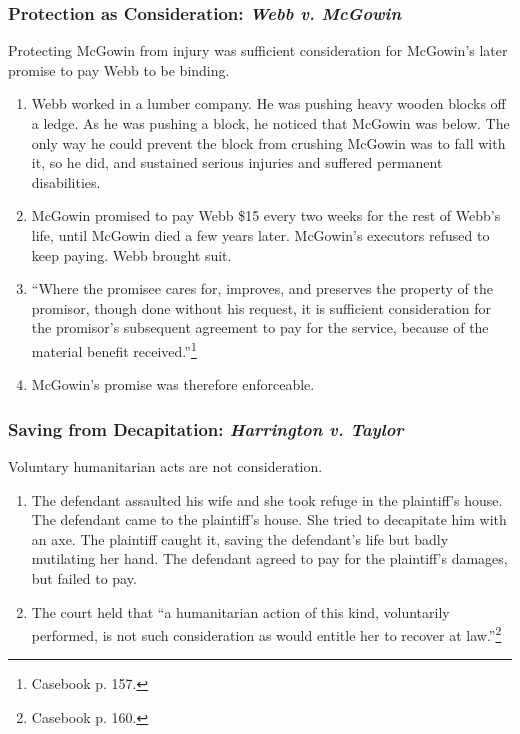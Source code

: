 \subsubsection{Protection as Consideration: \emph{Webb v. McGowin}}

Protecting McGowin from injury was sufficient consideration for McGowin's 
later promise to pay Webb to be binding.

\begin{enumerate}
    \item Webb worked in a lumber company. He was pushing heavy wooden blocks 
    off a ledge. As he was pushing a block, he noticed that McGowin was below. 
    The only way he could prevent the block from crushing McGowin was to fall 
    with it, so he did, and sustained serious injuries and suffered permanent 
    disabilities.
    \item McGowin promised to pay Webb \$15 every two weeks for the rest of 
    Webb's life, until McGowin died a few years later. McGowin's executors 
    refused to keep paying. Webb brought suit.
    \item ``Where the promisee cares for, improves, and preserves the property 
    of the promisor, though done without his request, it is sufficient 
    consideration for the promisor's subsequent agreement to pay for the 
    service, because of the material benefit received.''\footnote{Casebook p. 
    157.}
    \item McGowin's promise was therefore enforceable.
\end{enumerate}

\subsubsection{Saving from Decapitation: \emph{Harrington v. Taylor}}

Voluntary humanitarian acts are not consideration.

\begin{enumerate}
    \item The defendant assaulted his wife and she took refuge in the 
    plaintiff's house. The defendant came to the plaintiff's house. She tried 
    to decapitate him with an axe. The plaintiff caught it, saving the 
    defendant's life but badly mutilating her hand. The defendant agreed to 
    pay for the plaintiff's damages, but failed to pay.
    \item The court held that ``a humanitarian action of this kind, 
    voluntarily performed, is not such consideration as would entitle her to 
    recover at law.''\footnote{Casebook p. 160.}
\end{enumerate}

